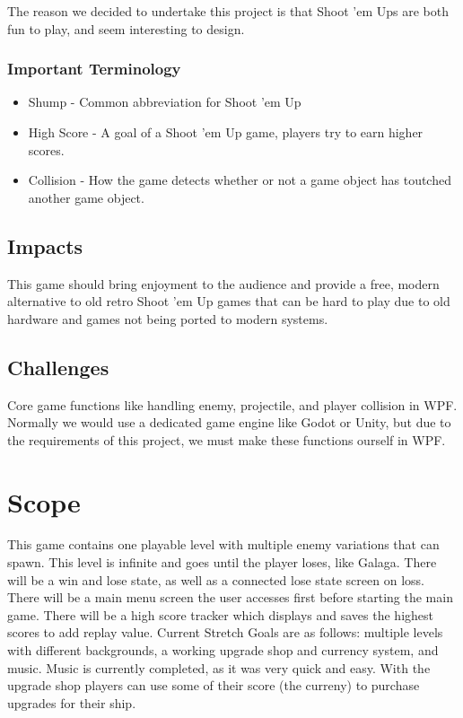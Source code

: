 \documentclass[10pt,conference,onecolumn,compsoc]{IEEEtran}
\begin{document}
The reason we decided to undertake this project is that Shoot 'em Ups are both fun to play, and seem interesting to design.

\subsubsection{Important Terminology}
\begin{itemize}
\item Shump - Common abbreviation for Shoot 'em Up
\item High Score - A goal of a Shoot 'em Up game, players try to earn higher scores.
\item Collision - How the game detects whether or not a game object has toutched another game object.
\end{itemize}

\subsection{Impacts}
This game should bring enjoyment to the audience and provide a free, modern alternative to old retro Shoot 'em Up games that can be hard to play due to old hardware and games not being ported to modern systems.

\subsection{Challenges}
Core game functions like handling enemy, projectile, and player collision in WPF. Normally we would use a dedicated game engine like Godot or Unity, but due to the requirements of this project, we must make these functions ourself in WPF.


\section{Scope}
This game contains one playable level with multiple enemy variations that can spawn. This level is infinite and goes until the player loses, like Galaga. There will be a win and lose state, as well as a connected lose state screen on loss. There will be a main menu screen the user accesses first before starting the main game. There will be a high score tracker which displays and saves the highest scores to add replay value. Current Stretch Goals are as follows: multiple levels with different backgrounds, a working upgrade shop and currency system, and music. Music is currently completed, as it was very quick and easy. With the upgrade shop players can use some of their score (the curreny) to purchase upgrades for their ship.
\end{document}
